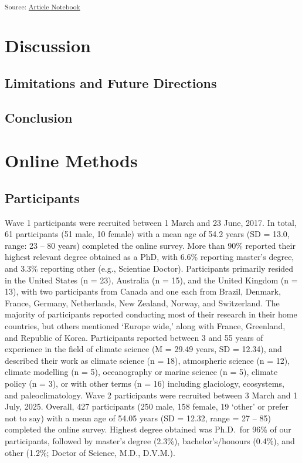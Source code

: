 \documentclass[
  man,
  longtable,
  nolmodern,
  notxfonts,
  notimes,
  colorlinks=true,linkcolor=blue,citecolor=blue,urlcolor=blue]{apa7}
\begin{document}
\textsubscript{Source:
\href{https://deborahapthorp.github.io/Amy_ClimateScientists/index.qmd.html}{Article
Notebook}}

\section{Discussion}\label{discussion}

\subsection{Limitations and Future
Directions}\label{limitations-and-future-directions}

\subsection{Conclusion}\label{conclusion}

\section{Online Methods}\label{online-methods}

\subsection{Participants}\label{participants}

Wave 1 participants were recruited between 1 March and 23 June, 2017. In
total, 61 participants (51 male, 10 female) with a mean age of 54.2
years (SD = 13.0, range: 23 -- 80 years) completed the online survey.
More than 90\% reported their highest relevant degree obtained as a PhD,
with 6.6\% reporting master's degree, and 3.3\% reporting other (e.g.,
Scientiae Doctor). Participants primarily resided in the United States
(n = 23), Australia (n = 15), and the United Kingdom (n = 13), with two
participants from Canada and one each from Brazil, Denmark, France,
Germany, Netherlands, New Zealand, Norway, and Switzerland. The majority
of participants reported conducting most of their research in their home
countries, but others mentioned `Europe wide,' along with France,
Greenland, and Republic of Korea. Participants reported between 3 and 55
years of experience in the field of climate science (M = 29.49 years, SD
= 12.34), and described their work as climate science (n = 18),
atmospheric science (n = 12), climate modelling (n = 5), oceanography or
marine science (n = 5), climate policy (n = 3), or with other terms (n =
16) including glaciology, ecosystems, and paleoclimatology. Wave 2
participants were recruited between 3 March and 1 July, 2025. Overall,
427 participants (250 male, 158 female, 19 `other' or prefer not to say)
with a mean age of 54.05 years (SD = 12.32, range = 27 -- 85) completed
the online survey. Highest degree obtained was Ph.D.~for 96\% of our
participants, followed by master's degree (2.3\%), bachelor's/honours
(0.4\%), and other (1.2\%; Doctor of Science, M.D., D.V.M.).
\end{document}
